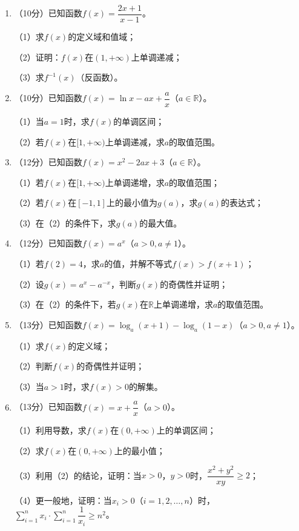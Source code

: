 \documentclass[12pt, a4paper]{ctexart}
\begin{document}
\begin{enumerate}[start=17]
\item （10分）已知函数$f(x)=\dfrac{2x+1}{x-1}$。

（1）求$f(x)$的定义域和值域；

（2）证明：$f(x)$在$(1,+\infty)$上单调递减；

（3）求$f^{-1}(x)$（反函数）。

\item （10分）已知函数$f(x)=\ln x-ax+\dfrac{a}{x}$（$a\in\mathbb{R}$）。

（1）当$a=1$时，求$f(x)$的单调区间；

（2）若$f(x)$在$[1,+\infty)$上单调递减，求$a$的取值范围。

\item （12分）已知函数$f(x)=x^2-2ax+3$（$a\in\mathbb{R}$）。

（1）若$f(x)$在$[1,+\infty)$上单调递增，求$a$的取值范围；

（2）若$f(x)$在$[-1,1]$上的最小值为$g(a)$，求$g(a)$的表达式；

（3）在（2）的条件下，求$g(a)$的最大值。

\item （12分）已知函数$f(x)=a^x$（$a>0,a\neq 1$）。

（1）若$f(2)=4$，求$a$的值，并解不等式$f(x)>f(x+1)$；

（2）设$g(x)=a^x-a^{-x}$，判断$g(x)$的奇偶性并证明；

（3）在（2）的条件下，若$g(x)$在$\mathbb{R}$上单调递增，求$a$的取值范围。

\item （13分）已知函数$f(x)=\log_a(x+1)-\log_a(1-x)$（$a>0,a\neq 1$）。

（1）求$f(x)$的定义域；

（2）判断$f(x)$的奇偶性并证明；

（3）当$a>1$时，求$f(x)>0$的解集。

\item （13分）已知函数$f(x)=x+\dfrac{a}{x}$（$a>0$）。

（1）利用导数，求$f(x)$在$(0,+\infty)$上的单调区间；

（2）求$f(x)$在$(0,+\infty)$上的最小值；

（3）利用（2）的结论，证明：当$x>0$，$y>0$时，$\dfrac{x^2+y^2}{xy}\geq 2$；

（4）更一般地，证明：当$x_i>0$（$i=1,2,\ldots,n$）时，$\sum\limits_{i=1}^{n}x_i\cdot\sum\limits_{i=1}^{n}\dfrac{1}{x_i}\geq n^2$。
\end{enumerate}
\end{document}
